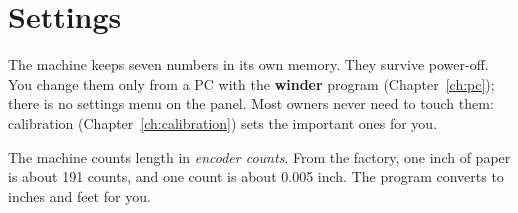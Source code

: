 \chapter{Settings}\label{ch:settings}

The machine keeps seven numbers in its own memory. They survive power-off.
You change them only from a PC with the \textbf{winder} program
(Chapter~\ref{ch:pc}); there is no settings menu on the panel. Most owners
never need to touch them: calibration (Chapter~\ref{ch:calibration}) sets the
important ones for you.

The machine counts length in \emph{encoder counts}. From the factory, one
inch of paper is about 191 counts, and one count is about 0.005 inch. The
program converts to inches and feet for you.

